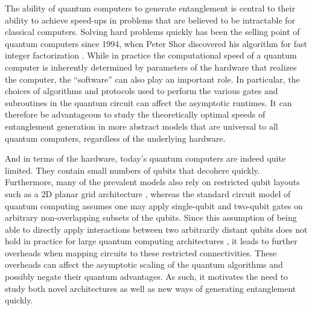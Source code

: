 The ability of quantum computers to generate entanglement is central to their ability to achieve speed-ups in problems that are believed to be intractable for classical computers.
Solving hard problems quickly has been the selling point of quantum computers since 1994, when Peter Shor discovered his algorithm for fast integer factorization \cite{Shor1997}.
While in practice the computational speed of a quantum computer is inherently determined by parameters of the hardware that realizes the computer, the ``software'' can also play an important role.
In particular, the choices of algorithms and protocols used to perform the various gates and subroutines in the quantum circuit can affect the asymptotic runtimes.
It can therefore be advantageous to study the theoretically optimal speeds of entanglement generation in more abstract models that are universal to all quantum computers, regardless of the underlying hardware.

And in terms of the hardware, today's quantum computers are indeed quite limited. They contain small numbers of qubits that decohere quickly. Furthermore, many of the prevalent models also rely on restricted qubit layouts such as a 2D planar grid architecture \cite{Arute2019}, whereas the standard circuit model of quantum computing assumes one may apply single-qubit and two-qubit gates on arbitrary non-overlapping subsets of the qubits.
Since this assumption of being able to directly apply interactions between two arbitrarily distant qubits does not hold in practice for large quantum computing architectures \cite{Monroe2014,Linke2017,Bapat2018,Childs2019c,Bapat2022}, it leads to further overheads when mapping circuits to these restricted connectivities.
These overheads can affect the asymptotic scaling of the quantum algorithms and possibly negate their quantum advantages.
As such, it motivates the need to study both novel architectures as well as new ways of generating entanglement quickly.

